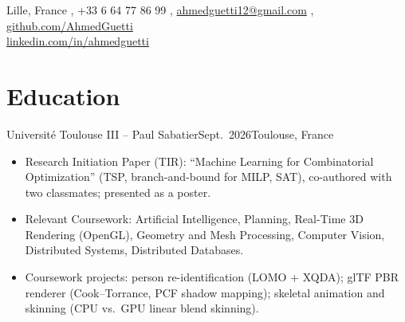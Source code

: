 \documentclass[english]{resume}
\begin{document}
  {Lille, France \sep
   +33 6 64 77 86 99 \sep
   \href{mailto:ahmedguetti12@gmail.com}{ahmedguetti12@gmail.com} \sep
   \href{https://github.com/AhmedGuetti}{github.com/AhmedGuetti}\\
   \href{https://www.linkedin.com/in/ahmedguetti/}{linkedin.com/in/ahmedguetti}}

\section{Education}
  {Université Toulouse III – Paul Sabatier}{Sept.\ 2026}{Toulouse, France}
\begin{itemize}
  \item Research Initiation Paper (TIR): “Machine Learning for Combinatorial Optimization” (TSP, branch-and-bound for MILP, SAT), co-authored with two classmates; presented as a poster.
  \item Relevant Coursework: Artificial Intelligence, Planning, Real-Time 3D Rendering (OpenGL), Geometry and Mesh Processing, Computer Vision, Distributed Systems, Distributed Databases.
  \item Coursework projects: person re-identification (LOMO + XQDA); glTF PBR renderer (Cook–Torrance, PCF shadow mapping); skeletal animation and skinning (CPU vs.\ GPU linear blend skinning).
\end{itemize}
\end{document}

